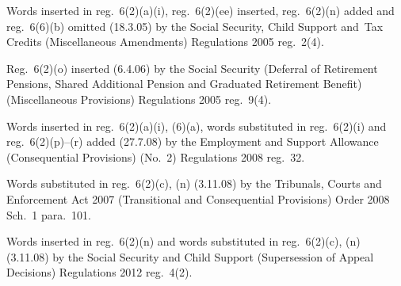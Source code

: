\documentclass[12pt,a4paper]{article}
\begin{document}
{Words inserted in reg.~6(2)(a)(i), reg.~6(2)(ee) inserted, reg.~6(2)(n) added and reg.~6(6)(b) omitted (18.3.05) by the Social Security, Child Support and~Tax Credits (Miscellaneous Amendments) Regulations 2005 reg.~2(4).

Reg.~6(2)(o) inserted (6.4.06) by the Social Security (Deferral of Retirement Pensions, Shared Additional Pension and Graduated Retirement Benefit) (Miscellaneous Provisions) Regulations 2005 reg.~9(4).

Words inserted in reg.~6(2)(a)(i), (6)(a), words substituted in reg.~6(2)(i) and reg.~6(2)(p)--(r) added (27.7.08) by the Employment and Support Allowance (Consequential Provisions) (No.~2) Regulations 2008 reg.~32.

Words substituted in reg.~6(2)(c), (n) (3.11.08) by the Tribunals, Courts and Enforcement Act 2007 (Transitional and Consequential Provisions) Order 2008 Sch.~1 para.~101.

Words inserted in reg.~6(2)(n) and words substituted in reg.~6(2)(c), (n) (3.11.08) by the Social Security and Child Support (Supersession of Appeal Decisions) Regulations 2012 reg.~4(2).
}
\end{document}
